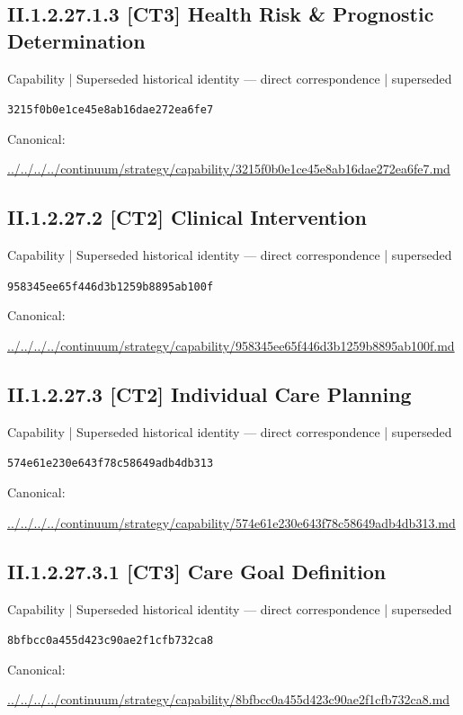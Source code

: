 \documentclass[10pt,a4paper]{article}
\begin{document}
\subsection*{II.1.2.27.1.3 [CT3] Health Risk \& Prognostic Determination}
{\small Capability | Superseded historical identity — direct correspondence | superseded}\par
\texttt{3215f0b0e1ce45e8ab16dae272ea6fe7}\par
Canonical: \par
{\footnotesize\url{../../../../continuum/strategy/capability/3215f0b0e1ce45e8ab16dae272ea6fe7.md}}\par
\subsection*{II.1.2.27.2 [CT2] Clinical Intervention}
{\small Capability | Superseded historical identity — direct correspondence | superseded}\par
\texttt{958345ee65f446d3b1259b8895ab100f}\par
Canonical: \par
{\footnotesize\url{../../../../continuum/strategy/capability/958345ee65f446d3b1259b8895ab100f.md}}\par
\subsection*{II.1.2.27.3 [CT2] Individual Care Planning}
{\small Capability | Superseded historical identity — direct correspondence | superseded}\par
\texttt{574e61e230e643f78c58649adb4db313}\par
Canonical: \par
{\footnotesize\url{../../../../continuum/strategy/capability/574e61e230e643f78c58649adb4db313.md}}\par
\subsection*{II.1.2.27.3.1 [CT3] Care Goal Definition}
{\small Capability | Superseded historical identity — direct correspondence | superseded}\par
\texttt{8bfbcc0a455d423c90ae2f1cfb732ca8}\par
Canonical: \par
{\footnotesize\url{../../../../continuum/strategy/capability/8bfbcc0a455d423c90ae2f1cfb732ca8.md}}\par
\end{document}
